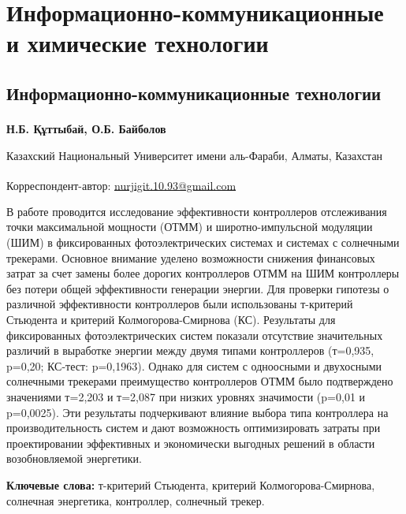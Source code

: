 \newpage
\let\cleardoublepage\clearpage
\part{Информационно-коммуникационные и химические технологии}
\chapter{Информационно-коммуникационные технологии}

\begin{articleheader}

{\bfseries
Н.Б. Құттыбай\textsuperscript{\envelope },
О.Б. Байболов
}
\end{articleheader}

\begin{affiliation}
Казахский Национальный Университет имени аль-Фараби, Алматы, Казахстан

\raggedright \textsuperscript{\envelope }Корреспондент-автор: \href{mailto:nurjigit.10.93@gmail.com}{nurjigit.10.93@gmail.com}
\end{affiliation}

В работе проводится исследование эффективности контроллеров отслеживания
точки максимальной мощности (ОТММ) и широтно-импульсной модуляции (ШИМ)
в фиксированных фотоэлектрических системах и системах с солнечными
трекерами. Основное внимание уделено возможности снижения финансовых
затрат за счет замены более дорогих контроллеров ОТММ на ШИМ контроллеры
без потери общей эффективности генерации энергии. Для проверки гипотезы
о различной эффективности контроллеров были использованы т-критерий
Стьюдента и критерий Колмогорова-Смирнова (КС). Результаты для
фиксированных фотоэлектрических систем показали отсутствие значительных
различий в выработке энергии между двумя типами контроллеров (т=0,935,
p=0,20; КС-тест: p=0,1963). Однако для систем с одноосными и двухосными
солнечными трекерами преимущество контроллеров ОТММ было подтверждено
значениями т=2,203 и т=2,087 при низких уровнях значимости (p=0,01 и
p=0,0025). Эти результаты подчеркивают влияние выбора типа контроллера
на производительность систем и дают возможность оптимизировать затраты
при проектировании эффективных и экономически выгодных решений в области
возобновляемой энергетики.

{\bfseries Ключевые слова:} т-критерий Стьюдента, критерий
Колмогорова-Смирнова, солнечная энергетика, контроллер, солнечный
трекер.

